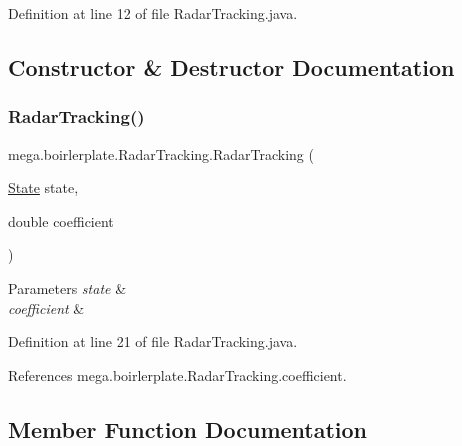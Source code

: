 Definition at line 12 of file Radar\+Tracking.\+java.



\subsection{Constructor \& Destructor Documentation}
\mbox{\label{classmega_1_1boirlerplate_1_1_radar_tracking_ad2c8701dfdda6182cc3209f9b6d54a24}} 
\subsubsection{\texorpdfstring{Radar\+Tracking()}{RadarTracking()}}
{\footnotesize\ttfamily mega.\+boirlerplate.\+Radar\+Tracking.\+Radar\+Tracking (\begin{DoxyParamCaption}\item[{\hyperlink{classmega_1_1boirlerplate_1_1_state}{State}}]{state,  }\item[{double}]{coefficient }\end{DoxyParamCaption})}


\begin{DoxyParams}{Parameters}
{\em state} & \\
\hline
{\em coefficient} & \\
\hline
\end{DoxyParams}


Definition at line 21 of file Radar\+Tracking.\+java.



References mega.\+boirlerplate.\+Radar\+Tracking.\+coefficient.



\subsection{Member Function Documentation}
\mbox{\label{classmega_1_1boirlerplate_1_1_radar_tracking_a80f37cb8ed25790d601f40ce52a81f05}} 

